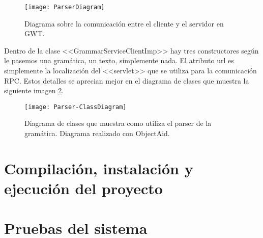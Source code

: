 \begin{figure}[h]
\centering
\texttt{[image: ParserDiagram]}
\caption{Diagrama sobre la comunicación entre el cliente y el servidor en GWT.}
\label{fig:5.2}
\end{figure}

Dentro de la clase <<GrammarServiceClientImp>> hay tres constructores según le pasemos una gramática, un texto, simplemente nada. El atributo url es simplemente la localización del <<servlet>> que se utiliza para la comunicación RPC. Estos detalles se aprecian mejor en el diagrama de clases que muestra la siguiente imagen \ref{fig:5.3}.

\begin{figure}
\raggedleft
\texttt{[image: Parser-ClassDiagram]}
\caption{Diagrama de clases que muestra como utiliza el parser de la gramática. Diagrama realizado con ObjectAid.}
\label{fig:5.3}
\end{figure}

\section{Compilación, instalación y ejecución del proyecto}

\section{Pruebas del sistema}
